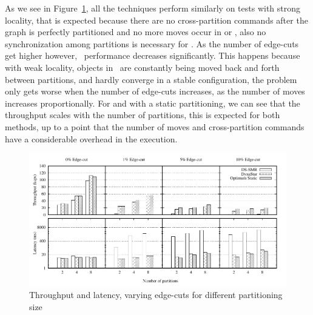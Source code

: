 As we see in Figure~\ref{fig:varying_edge_cut}, all the techniques perform similarly on tests with strong locality, that is
expected because there are no cross-partition commands after the graph is perfectly partitioned and no more moves 
occur in \dynastar or \dssmr, also no synchronization among partitions is necessary for \ssmr.
As the number of edge-cuts get higher however, \dssmr\ performance decreases significantly.
This happens because with weak locality, objects in \dssmr\ are constantly being moved back and forth between partitions,
and hardly converge in a stable configuration, the problem only gets worse when the number of edge-cuts increases, as
the number of moves increases proportionally.
For \dynastar and \ssmr with a static partitioning, we can see that the throughput scales 
with the number of partitions, this is expected for both methods, up to a point that the number of moves and cross-partition
commands have a considerable overhead in the execution.

\begin{figure}[ht!]
	\includegraphics{figures/experiments/throughput-latency-avg-all}
	\caption{Throughput and latency, varying edge-cuts for different partitioning size}
	\label{fig:varying_edge_cut}
\end{figure}



